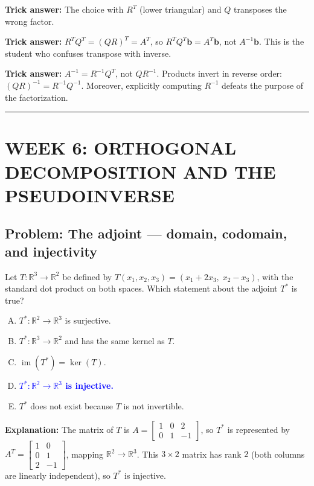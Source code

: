 \documentclass[12pt]{amsart}
\newcommand{\divider}{
  \vspace{-1em}
  \noindent
  \raisebox{-0.15ex}{\textbullet}%
  \hspace{0.5em}%
  \rule[0.5ex]{0.95\textwidth}{1.0pt}%
  \hspace{0.5em}%
  \raisebox{-0.15ex}{\textbullet}%
  \vspace{0em}
}
\begin{document}
\textbf{Trick answer:}
The choice with $R^T$ (lower triangular) and $Q$ transposes the wrong factor.

\textbf{Trick answer:}
$R^T Q^T = (QR)^T = A^T$, so $R^T Q^T\mathbf{b} = A^T\mathbf{b}$, not $A^{-1}\mathbf{b}$.
This is the student who confuses transpose with inverse.

\textbf{Trick answer:}
$A^{-1} = R^{-1}Q^T$, not $QR^{-1}$.
Products invert in reverse order: $(QR)^{-1} = R^{-1}Q^{-1}$.
Moreover, explicitly computing $R^{-1}$ defeats the purpose of the factorization.

\divider

\section*{WEEK 6: ORTHOGONAL DECOMPOSITION AND THE PSEUDOINVERSE}

\subsection*{Problem: The adjoint --- domain, codomain, and injectivity}

Let $T: \mathbb{R}^3 \to \mathbb{R}^2$ be defined by
$T(x_1, x_2, x_3) = (x_1 + 2x_3,\; x_2 - x_3)$,
with the standard dot product on both spaces.
Which statement about the adjoint $T^*$ is true?

\begin{enumerate}[(A)]
\item $T^*: \mathbb{R}^2 \to \mathbb{R}^3$ is surjective.
\item $T^*: \mathbb{R}^3 \to \mathbb{R}^2$ and has the same kernel as $T$.
\item $\operatorname{im}(T^*) = \ker(T)$.
\item \textcolor{blue}{\textbf{$T^*: \mathbb{R}^2 \to \mathbb{R}^3$ is injective.}}
\item $T^*$ does not exist because $T$ is not invertible.
\end{enumerate}

\textbf{Explanation:}
The matrix of $T$ is $A = \begin{bmatrix}1&0&2\\0&1&-1\end{bmatrix}$, so $T^*$ is
represented by $A^T = \begin{bmatrix}1&0\\0&1\\2&-1\end{bmatrix}$, mapping
$\mathbb{R}^2\to\mathbb{R}^3$.
This $3\times 2$ matrix has rank $2$ (both columns are linearly independent),
so $T^*$ is injective.
\end{document}
